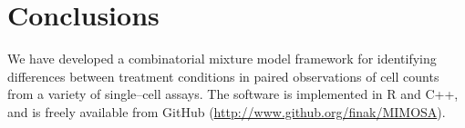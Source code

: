 \documentclass[11pt]{article}
\begin{document}
\section*{Conclusions}
We have developed a combinatorial mixture model framework for identifying differences between treatment conditions in paired observations of cell counts from a variety of single--cell assays. The software is implemented in R and C++, and is freely available from GitHub (\url{http://www.github.org/finak/MIMOSA}). 
%
\end{document}
